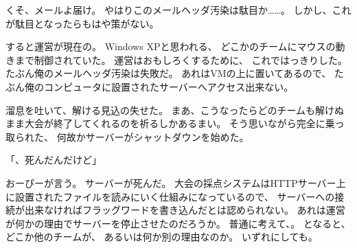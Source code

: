 くそ、メールよ届け。
やはりこのメールヘッダ汚染は駄目か……。
しかし、これが駄目となったらもはや策がない。

すると運営が現在の。
Windows XPと思われる、
どこかのチームにマウスの動きまで制御されていた。
運営はおもしろくするために、
これではっきりした。
たぶん俺のメールヘッダ汚染は失敗だ。
あれはVMの上に置いてあるので、
たぶん俺のコンピュータに設置されたサーバーへアクセス出来ない。

溜息を吐いて、解ける見込の失せた。
まあ、こうなったらどのチームも解けぬまま大会が終了してくれるのを祈るしかあるまい。
そう思いながら完全に乗っ取られた、
何故かサーバーがシャットダウンを始めた。

「\Jupiter、死んだんだけど」

おーぴーが言う。
サーバーが死んだ。
大会の採点システムはHTTPサーバー上に設置されたファイルを読みにいく仕組みになっているので、
サーバーへの接続が出来なければフラッグワードを書き込んだとは認められない。
あれは運営が何かの理由でサーバーを停止させたのだろうか。
普通に考えて、。
となると、どこか他のチームが、
あるいは何か別の理由なのか。
いずれにしても。


